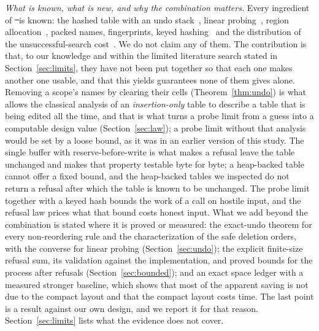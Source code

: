 \emph{What is known, what is new, and why the combination matters.} Every ingredient of \st\ is known: the hashed table with an undo stack~\cite{appel1998}, linear probing~\cite{knuth3}, region allocation~\cite{hanson1990}, packed names, fingerprints, keyed hashing~\cite{aumasson2012} and the distribution of the unsuccessful-search cost~\cite{knuth3,janson2016}. We do not claim any of them. The contribution is that, to our knowledge and within the limited literature search stated in Section~\ref{sec:limits}, they have not been put together so that each one makes another one usable, and that this yields guarantees none of them gives alone. Removing a scope's names by clearing their cells (Theorem~\ref{thm:undo}) is what allows the classical analysis of an \emph{insertion-only} table to describe a table that is being edited all the time, and that is what turns a probe limit from a guess into a computable design value (Section~\ref{sec:law}); a probe limit without that analysis would be set by a loose bound, as it was in an earlier version of this study. The single buffer with reserve-before-write is what makes a refusal leave the table unchanged and makes that property testable byte for byte; a heap-backed table cannot offer a fixed bound, and the heap-backed tables we inspected do not return a refusal after which the table is known to be unchanged. The probe limit together with a keyed hash bounds the work of a call on hostile input, and the refusal law prices what that bound costs honest input. What we add beyond the combination is stated where it is proved or measured: the exact-undo theorem for every non-reordering rule and the characterization of the safe deletion orders, with the converse for linear probing (Section~\ref{sec:undo}); the explicit finite-size refusal sum, its validation against the implementation, and proved bounds for the process after refusals (Section~\ref{sec:bounded}); and an exact space ledger with a measured stronger baseline, which shows that most of the apparent saving is not due to the compact layout and that the compact layout costs time. The last point is a result against our own design, and we report it for that reason. Section~\ref{sec:limits} lists what the evidence does not cover.

